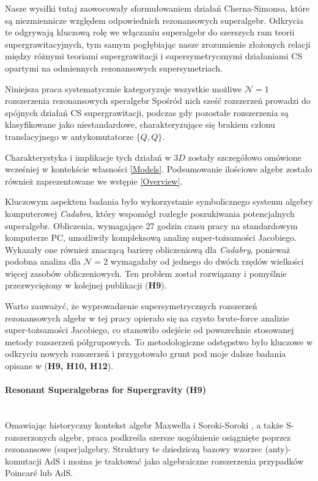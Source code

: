 \documentclass[12pt,a4paper]{article}
\newcommand{\myparagraph}[1]{\paragraph{#1}\mbox{}\\}
\begin{document}
Nasze wysiłki tutaj zaowocowały sformułowaniem działań Cherna-Simonsa, które są niezmiennicze względem odpowiednich rezonansowych superalgebr. Odkrycia te odgrywają kluczową rolę we włączaniu superalgebr do szerszych ram teorii supergrawitacyjnych, tym samym pogłębiając nasze zrozumienie złożonych relacji między różnymi teoriami supergrawitacji i supersymetrycznymi działaniami CS opartymi na odmiennych rezonansowych supersymetriach.

Niniejsza praca systematycznie kategoryzuje wszystkie możliwe  $\mathcal{N}=1$ rozszerzenia rezonansowych speralgebr Spośród nich sześć rozszerzeń prowadzi do spójnych działań CS supergrawitacji, podczas gdy pozostałe rozszerzenia są klasyfikowane jako niestandardowe, charakteryzujące się brakiem członu translacyjnego w antykomutatorze $\{Q, Q\}$. 

Charakterystyka i implikacje tych działań w $3D$ zostały szczegółowo omówione wcześniej w kontekście własności \eqref{Models}. Podsumowanie ilościowe algebr zostało również zaprezentowane we wstępie \eqref{Overview}.

Kluczowym aspektem badania było wykorzystanie symbolicznego systemu algebry komputerowej \textit{Cadabra}, który wspomógł rozległe poszukiwania potencjalnych superalgebr. Obliczenia, wymagające 27 godzin czasu pracy na standardowym komputerze PC, umożliwiły kompleksową analizę super-tożsamości Jacobiego. Wykazały one również znaczącą barierę obliczeniową dla \textit{Cadabry}, ponieważ podobna analiza dla $\mathcal{N}=2$ wymagałaby od jednego do dwóch rzędów wielkości więcej zasobów obliczeniowych. Ten problem został rozwiązany i pomyślnie przezwyciężony w kolejnej publikacji (\textbf{H9}). 

Warto zauważyć, że wyprowadzenie supersymetrycznych rozszerzeń rezonansowych algebr w tej pracy opierało się na czysto brute-force analizie super-tożsamości Jacobiego, co stanowiło odejście od powszechnie stosowanej metody rozszerzeń półgrupowych. To metodologiczne odstępstwo było kluczowe w odkryciu nowych rozszerzeń i przygotowało grunt pod moje dalsze badania opisane w (\textbf{H9, H10, H12}).

\myparagraph{Resonant Superalgebras for Supergravity (H9)}

Omawiając historyczny kontekst algebr Maxwella \cite{Bacry:1970ye, Schrader:1972zd} i Soroki-Soroki \cite{Soroka:2006aj}, a także S-rozszerzonych algebr, praca podkreśla szersze uogólnienie osiągnięte poprzez rezonansowe (super)algebry. Struktury te dziedziczą bazowy wzorzec (anty)-komutacji AdS i można je traktować jako algebraiczne rozszerzenia przypadków Poincaré lub AdS.
\end{document}
